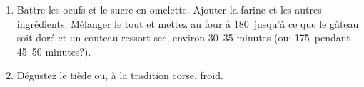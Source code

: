 
\begin{ingredients}
\end{ingredients}


\begin{recipe}
  \begin{enumerate}

  \item Battre les oeufs et le sucre en omelette.  Ajouter la farine
    et les autres ingr\'edients.  M\'elanger le tout et mettez au four
    \`a 180\C\ jusqu'\`a ce que le g\^ateau soit dor\'e et un couteau
    ressort sec, environ 30--35 minutes (ou: 175\C\ pendant 45--50 minutes?).

  \item D\'egustez le ti\`ede ou, \`a la tradition corse, froid.

  \end{enumerate}
\end{recipe}


